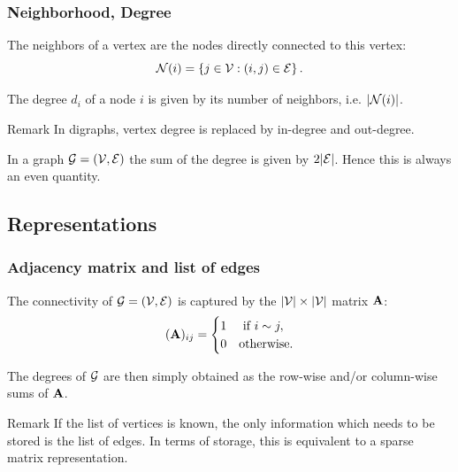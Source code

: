 \documentclass{beamer}\usepackage[]{graphicx}\usepackage[]{color}
\begin{document}
\begin{frame}
  \frametitle{Neighborhood, Degree}

  \begin{definition}[Neighborhood]
    The neighbors of a vertex are the nodes directly connected to this vertex:
    \[
      \mathcal{N}(i) = \left\{j\in\mathcal{V} : (i,j) \in \mathcal{E}\right\}.
    \]
  \end{definition}
  
  \begin{definition}[Degree]
    The degree $d_i$ of a node $i$ is given by its number of neighbors, i.e. $|\mathcal{N}(i)|$.
  \end{definition}

  \begin{block}{Remark}
    In digraphs, vertex degree is replaced by \alert{in-degree} and \alert{out-degree}.
  \end{block}

  \begin{proposition}
    In a graph $\mathcal{G} = (\mathcal{V},\mathcal{E})$ the sum of the degree is given by $2|\mathcal{E}|$. Hence \alert{this is always an even quantity}.
  \end{proposition}
  
  
\end{frame}

\subsection{Representations}

\begin{frame}
  \frametitle{Adjacency matrix and list of edges}

  \begin{definition}
    The connectivity of  $\mathcal{G} = (\mathcal{V},\mathcal{E})$ is captured by the $|\mathcal{V}|\times |\mathcal{V}|$ matrix $\mathbf{A}$:
    \[
      (\mathbf{A})_{ij} = \begin{cases}
      1  & \text{ if } i \sim j,\\
      0  & \text{otherwise}.
      \end{cases}
    \]
  \end{definition}

  \begin{proposition}
    The degrees of $\mathcal{G}$ are then simply obtained as the row-wise and/or column-wise sums of $\mathbf{A}$.
  \end{proposition}

  \begin{block}{Remark}
    If the list of vertices is known, the only information which needs to be stored is the list of edges. In terms of storage, this is equivalent to a sparse matrix representation.
  \end{block}
  
\end{frame}
\end{document}
